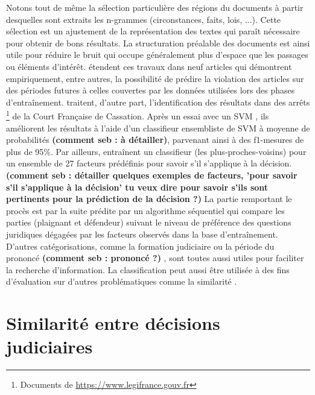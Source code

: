 Notons tout de même la sélection particulière des régions du documents à partir desquelles sont extraits les n-grammes (circonstances, faits, lois, ...). Cette sélection est un ajustement de la représentation des textes qui paraît nécessaire pour obtenir de bons résultats. La structuration préalable des documents est ainsi utile pour réduire le bruit qui occupe généralement plus d'espace que les passages ou éléments d'intérêt.  \citet{medvedeva2018echrCristalBall} étendent ces travaux dans neuf articles qui démontrent empiriquement, entre autres, la possibilité de prédire la violation des articles sur des périodes futures à celles couvertes par les données utilisées lors des phases d'entraînement. \cite{sulea2017legalEnsSVM} traitent, d'autre part, l'identification des résultats dans des arrêts \footnote{Documents de \url{https://www.legifrance.gouv.fr}} de la Court Française de Cassation. Après un essai avec un SVM \citep{Sulea2017predictareadecision}, ils améliorent les résultats à l'aide d'un classifieur ensembliste de SVM à moyenne de probabilités \textbf{(comment seb : à détailler)}, parvenant ainsi à des f1-mesures de plus de 95\%.  Par ailleurs, \cite{Ashley2009classifCases} entraînent un classifieur (les plus-proches-voisins) pour un ensemble de 27 facteurs prédéfinis pour savoir s'il s'applique à la décision. \textbf{(comment seb : détailler quelques exemples de facteurs, 'pour savoir s'il s'applique à la décision' tu veux dire pour savoir s'ils sont pertinents pour la prédiction de la décision ?)} La partie remportant le procès est par la suite prédite par un algorithme séquentiel qui compare les parties (plaignant et défendeur) suivant le niveau de préférence des questions juridiques dégagées par les facteurs observés dans la base d'entraînement. D'autres catégorisations, comme la formation judiciaire ou la période du prononcé {\textbf{(comment seb : prononcé ?)}}  \citep{Sulea2017predictareadecision,sulea2017legalEnsSVM}, sont toutes aussi utiles pour faciliter la recherche d'information. La classification peut aussi être utilisée à des fins d'évaluation sur d'autres problématiques comme la similarité \citep{ma2018wmdchinesecase}.

\section{Similarité entre décisions judiciaires}

